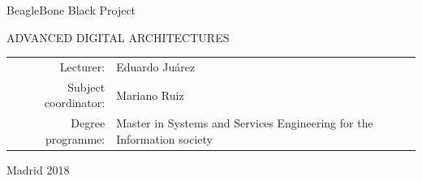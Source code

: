 \documentclass[UKenglish,10pt,a4paper]{report}
\let\openright=\clearpage
\begin{document}
\begin{titlepage}
\begin{center}
\vspace{10mm}

{\LARGE\bfseries } BeagleBone Black Project

\vfill

ADVANCED DIGITAL ARCHITECTURES

\vfill

\begin{tabular}{rl}

Lecturer: & Eduardo Juárez  \\
\noalign{\vspace{2mm}}
Subject coordinator: & Mariano Ruiz \\
\noalign{\vspace{2mm}}
Degree programme: & Master in Systems and Services Engineering for the Information society \\
\end{tabular}

\vfill

Madrid 2018

\end{center}
\end{titlepage}
\newpage



\openright

\noindent






\openright
\pagestyle{plain}
\setcounter{page}{1}
\tableofcontents

\end{document}
